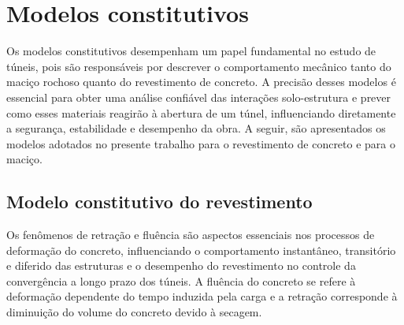 %
%
%
%
\chapter{Modelos constitutivos}\label{modelosconstitutivos}

Os modelos constitutivos desempenham um papel fundamental no estudo de túneis, pois são responsáveis por descrever o comportamento mecânico tanto do maciço rochoso quanto do revestimento de concreto. A precisão desses modelos é essencial para obter uma análise confiável das interações solo-estrutura e prever como esses materiais reagirão à abertura de um túnel, influenciando diretamente a segurança, estabilidade e desempenho da obra. A seguir, são apresentados os modelos adotados no presente trabalho para o revestimento de concreto e para o maciço.

\section{Modelo constitutivo do revestimento}

Os fenômenos de retração e fluência são aspectos essenciais nos processos de deformação do concreto, influenciando o comportamento instantâneo, transitório e diferido das estruturas e o desempenho do revestimento no controle da convergência a longo prazo dos túneis. A fluência do concreto se refere à deformação dependente do tempo induzida pela carga e a retração corresponde à diminuição do volume do concreto devido à secagem. 


